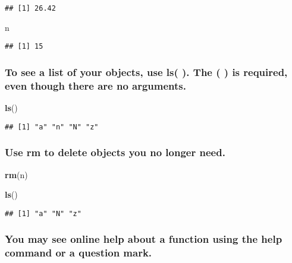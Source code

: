 \documentclass[]{article}
\newenvironment{Shaded}{\begin{snugshade}}{\end{snugshade}}
\newcommand{\KeywordTok}[1]{\textcolor[rgb]{0.13,0.29,0.53}{\textbf{#1}}}
\newcommand{\NormalTok}[1]{#1}
\begin{document}
\begin{verbatim}
## [1] 26.42
\end{verbatim}

\begin{Shaded}
\begin{Highlighting}[]
\NormalTok{n}
\end{Highlighting}
\end{Shaded}

\begin{verbatim}
## [1] 15
\end{verbatim}

\subsubsection{To see a list of your objects, use ls( ). The ( ) is
required, even though there are no
arguments.}\label{to-see-a-list-of-your-objects-use-ls-.-the-is-required-even-though-there-are-no-arguments.}

\begin{Shaded}
\begin{Highlighting}[]
\KeywordTok{ls}\NormalTok{()}
\end{Highlighting}
\end{Shaded}

\begin{verbatim}
## [1] "a" "n" "N" "z"
\end{verbatim}

\subsubsection{Use rm to delete objects you no longer
need.}\label{use-rm-to-delete-objects-you-no-longer-need.}

\begin{Shaded}
\begin{Highlighting}[]
\KeywordTok{rm}\NormalTok{(n)}
\end{Highlighting}
\end{Shaded}

\begin{Shaded}
\begin{Highlighting}[]
\KeywordTok{ls}\NormalTok{()}
\end{Highlighting}
\end{Shaded}

\begin{verbatim}
## [1] "a" "N" "z"
\end{verbatim}

\subsubsection{You may see online help about a function using the help
command or a question
mark.}\label{you-may-see-online-help-about-a-function-using-the-help-command-or-a-question-mark.}
\end{document}
